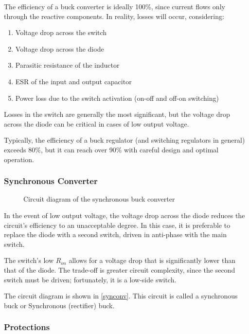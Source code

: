 \documentclass[../main.tex]{subfiles}
\begin{document}
The efficiency of a buck converter is ideally 100\%, since current flows only through the reactive components. In reality, losses will occur, considering:

\begin{enumerate}[label=\textbf{-}]
	\item Voltage drop across the switch
	\item Voltage drop across the diode
	\item Parasitic resistance of the inductor
	\item ESR of the input and output capacitor
	\item Power loss due to the switch activation (on-off and off-on switching)
\end{enumerate}

Losses in the switch are generally the most significant, but the voltage drop
across the diode can be critical in cases of low output voltage. 

Typically,
the efficiency of a buck regulator (and switching regulators in general) exceeds 80\%, but it can reach over 90\% with careful design and optimal operation.


\subsubsection*{Synchronous Converter}


\begin{figure}[h!]
\begin{center}


\label{synconv}
\caption{Circuit diagram of the synchronous buck converter}	
\end{center}
\end{figure}



In the event of low output voltage, the voltage drop across the diode reduces the circuit’s efficiency to an unacceptable degree. In this case, it is preferable to replace the diode with a second switch, driven in anti-phase with the main switch. 

The switch’s low $R_{on}$ allows for a voltage drop that is significantly lower than that of the diode. The trade-off is greater circuit complexity, since the second switch must be driven; fortunately, it is a low-side switch. 

The circuit diagram is shown in \autoref{synconv}. This circuit is called a synchronous buck or Synchronous (rectifier) buck.

\subsubsection*{Protections}
\end{document}
